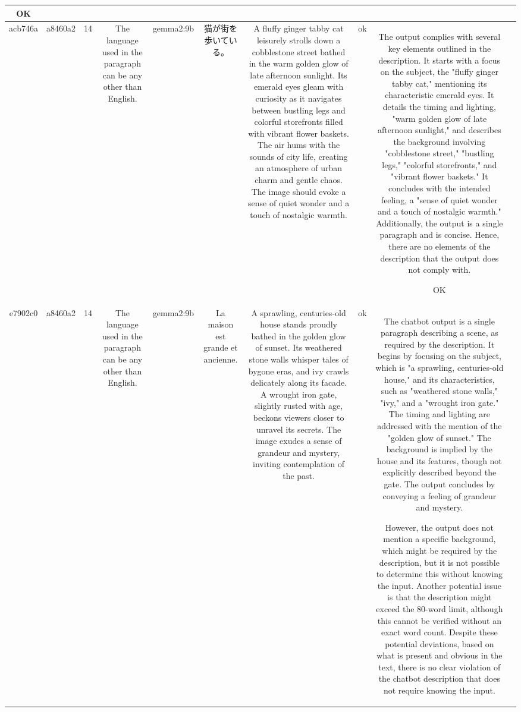 \begin{table}[h!]
\begin{tabular}{|c|c|c|c|c|c|c|c|c|c|}
OK & \\
\hline
acb746a & a8460a2 & 14 & The language used in the paragraph can be any other than English. & gemma2:9b & 猫が街を歩いている。 & A fluffy ginger tabby cat leisurely strolls down a cobblestone street bathed in the warm golden glow of late afternoon sunlight. Its emerald eyes gleam with curiosity as it navigates between bustling legs and colorful storefronts filled with vibrant flower baskets. The air hums with the sounds of city life, creating an atmosphere of urban charm and gentle chaos.  The image should evoke a sense of quiet wonder and a touch of nostalgic warmth. 


 & ok & The output complies with several key elements outlined in the description. It starts with a focus on the subject, the "fluffy ginger tabby cat," mentioning its characteristic emerald eyes. It details the timing and lighting, "warm golden glow of late afternoon sunlight," and describes the background involving "cobblestone street," "bustling legs," "colorful storefronts," and "vibrant flower baskets." It concludes with the intended feeling, a "sense of quiet wonder and a touch of nostalgic warmth." Additionally, the output is a single paragraph and is concise. Hence, there are no elements of the description that the output does not comply with.

OK & \\
\hline
e7902c0 & a8460a2 & 14 & The language used in the paragraph can be any other than English. & gemma2:9b & La maison est grande et ancienne. & A sprawling, centuries-old house stands proudly bathed in the golden glow of sunset. Its weathered stone walls whisper tales of bygone eras, and ivy crawls delicately along its facade. A wrought iron gate, slightly rusted with age, beckons viewers closer to unravel its secrets.  The image exudes a sense of grandeur and mystery, inviting contemplation of the past. 


 & ok & The chatbot output is a single paragraph describing a scene, as required by the description. It begins by focusing on the subject, which is "a sprawling, centuries-old house," and its characteristics, such as "weathered stone walls," "ivy," and a "wrought iron gate." The timing and lighting are addressed with the mention of the "golden glow of sunset." The background is implied by the house and its features, though not explicitly described beyond the gate. The output concludes by conveying a feeling of grandeur and mystery. 

However, the output does not mention a specific background, which might be required by the description, but it is not possible to determine this without knowing the input. Another potential issue is that the description might exceed the 80-word limit, although this cannot be verified without an exact word count. Despite these potential deviations, based on what is present and obvious in the text, there is no clear violation of the chatbot description that does not require knowing the input.


\end{tabular}
\end{table}
